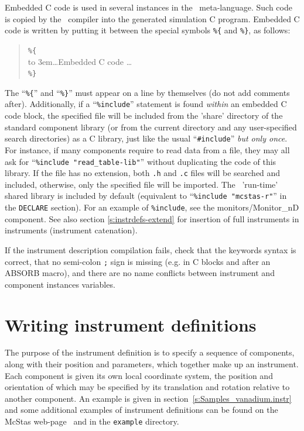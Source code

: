 Embedded C code is used in several instances in the \MCS\
meta-language. Such code is copied by the \MCS\ compiler into the
generated simulation C program. Embedded C code is written by putting it
between the special symbols \verb|%{| and \verb|%}|, as follows:
\begin{quote}
  \verb|%{| \\
  \hbox to 3em{}\ldots Embedded C code \ldots \\
  \verb|%}|
\end{quote} 
The ``\verb|%{|'' and ``\verb|%}|'' must appear on a line by themselves (do not add comments after).
Additionally, if a ``\verb+%include+'' statement is found \emph{within} an embedded C code block, the specified file will be included from the 'share' directory of the standard component library  (or from the
current directory and any user-specified search directories) as a C library, just like the usual ``\verb+#include+'' \emph{but only once}. For instance, if many components require to read data from a file, they may all ask for ``\verb+%include "read_table-lib"+''  without duplicating the code of this library. If the file has no extension, both \verb+.h+ and \verb+.c+ files will be searched and included, otherwise, only the specified file will be imported. The \MCS\ 'run-time' shared
library is included by default (equivalent to ``\verb+%include "mcstas-r"+'' in the \texttt{DECLARE} section). \index{Library!Run-time}
For an
example of \texttt{\%include}, see the monitors/Monitor\_nD component. See also section \ref{s:instrdefs-extend} for insertion of full instruments in instruments (instrument catenation).

If the instrument description compilation fails, check that the
keywords syntax is correct, that no semi-colon \verb+;+ sign is
missing (e.g. in C blocks and after an ABSORB macro), and there are no name conflicts between instrument and component instances variables.


\section{Writing instrument definitions}
\label{s:instrdefs}

The purpose of the instrument definition is to specify a sequence of
components, along with their position and parameters, which together
make up an instrument. Each component is given its own local coordinate
system, the position and orientation of which may be specified by its
translation and rotation relative to another component. An example is
given in section~\ref{s:Samples_vanadium.instr} and some additional
examples of instrument definitions can be found on the McStas
web-page~\cite{mcstas_webpage} and in the \texttt{example} directory.

